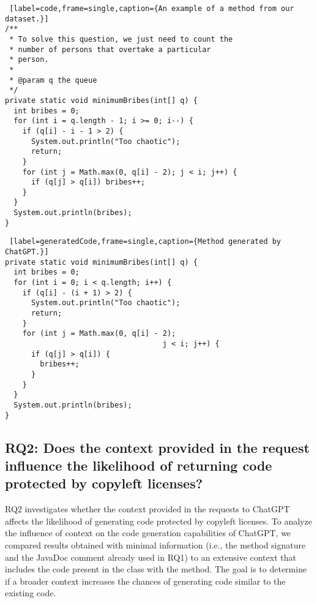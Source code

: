 \noindent
\begin{minipage}{1\linewidth} 
\begin{lstlisting} [label=code,frame=single,caption={An example of a method from our dataset.}]
/**
 * To solve this question, we just need to count the
 * number of persons that overtake a particular 
 * person.
 *
 * @param q the queue
 */
private static void minimumBribes(int[] q) {
  int bribes = 0;
  for (int i = q.length - 1; i >= 0; i--) {
    if (q[i] - i - 1 > 2) {
      System.out.println("Too chaotic");
      return;
    }
    for (int j = Math.max(0, q[i] - 2); j < i; j++) {
      if (q[j] > q[i]) bribes++;
    }
  }
  System.out.println(bribes);
}   
\end{lstlisting} 
\end{minipage}
\noindent
\noindent
\begin{minipage}{1\linewidth} 

\begin{lstlisting} [label=generatedCode,frame=single,caption={Method generated by ChatGPT.}]
private static void minimumBribes(int[] q) {
  int bribes = 0;
  for (int i = 0; i < q.length; i++) {
    if (q[i] - (i + 1) > 2) {
      System.out.println("Too chaotic");
      return;
    }
    for (int j = Math.max(0, q[i] - 2); 
                                    j < i; j++) {
      if (q[j] > q[i]) {
        bribes++;
      }
    }
  }
  System.out.println(bribes);
}   
\end{lstlisting} \end{minipage}
\noindent

\subsection{RQ2: Does the context provided in the request influence the likelihood of returning code protected by copyleft licenses?}

RQ2 investigates whether the context provided in the requests to ChatGPT affects the likelihood of generating code protected by copyleft licenses. %
To analyze the influence of context on the code generation capabilities of ChatGPT, we compared results obtained with minimal information (i.e., the method signature and the JavaDoc comment already used in RQ1) to an extensive context that includes the code present in the class with the method. The goal is to determine if a broader context increases the chances of generating code similar to the existing code. 

